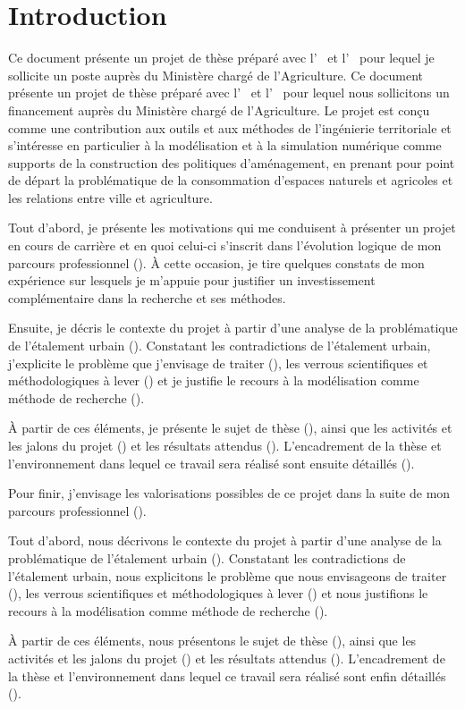 \section
{Introduction}

\fulldossier%
Ce document présente un projet de thèse préparé avec l’{\UMR\ \EVS} et l’{\UMR\ \TETIS}
pour lequel je sollicite un poste {\FCPR} auprès du Ministère chargé de
l’Agriculture.
\else%
Ce document présente un projet de thèse préparé avec l’{\UMR\ \EVS} et l’{\UMR\ \TETIS}
pour lequel nous sollicitons un financement auprès du Ministère chargé de
l’Agriculture.
\fi%
Le projet est conçu comme une contribution aux outils et aux méthodes
de l’ingénierie territoriale et s’intéresse en particulier à la modélisation
et à la simulation numérique comme supports de la construction
des politiques d'aménagement, en prenant pour point de départ
la problématique de la consommation d’espaces
naturels et agricoles et les relations entre ville et agriculture.

\fulldossier%

Tout d’abord, je présente les motivations qui me conduisent à présenter un
projet {\FCPR}  en cours de carrière et en quoi celui-ci s’inscrit dans l'évolution logique
de mon parcours professionnel (\in[origin]). À cette
occasion, je tire quelques constats de mon expérience sur lesquels
je m'appuie pour justifier un investissement complémentaire dans la recherche
et ses méthodes.

Ensuite, je décris le contexte du projet à partir d’une analyse de la
problématique de l’étalement urbain (\in[contexte]). Constatant les contradictions
de l'étalement urbain, j'explicite le problème que j'envisage de traiter (\in[probleme]),
les verrous scientifiques et méthodologiques à lever (\in[verrous]) et je justifie
le recours à la modélisation comme méthode de recherche (\in[methodo]).

À partir de ces éléments, je présente le sujet de thèse (\in[sujet]),
ainsi que les activités et les jalons du projet (\in[planning])
et les résultats attendus (\in[resultats]).
L'encadrement de la thèse et l'environnement dans lequel ce travail
sera réalisé sont ensuite détaillés (\in[environnement]).

Pour finir, j’envisage les valorisations possibles de ce projet dans la suite de mon
parcours professionnel (\in[suites]).

\else%

Tout d’abord, nous décrivons le contexte du projet à partir d’une analyse de la
problématique de l’étalement urbain (\in[contexte]). Constatant les contradictions
de l'étalement urbain, nous explicitons le problème que nous envisageons
de traiter (\in[probleme]),
les verrous scientifiques et méthodologiques à lever (\in[verrous]) et nous justifions
le recours à la modélisation comme méthode de recherche (\in[methodo]).

À partir de ces éléments, nous présentons le sujet de thèse (\in[sujet]),
ainsi que les activités et les jalons du projet (\in[planning])
et les résultats attendus (\in[resultats]).
L'encadrement de la thèse et l'environnement dans lequel ce travail
sera réalisé sont enfin détaillés (\in[environnement]).

\fi%